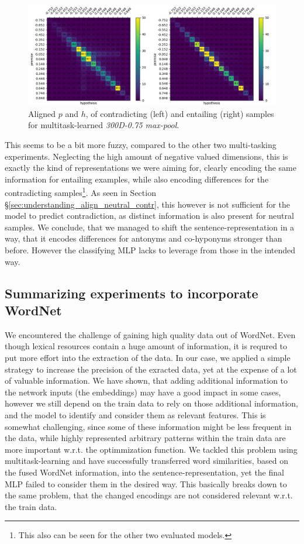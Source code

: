 \begin{figure}[tph!]
\centering
	\includegraphics[totalheight=7cm]{fig/masking_e_c.png}
	\caption{Aligned $p$ and $h$, of contradicting (left) and entailing (right) samples for multitask-learned \textit{300D-0.75 max-pool}.}
	\label{fig:masking_e_c}
\end{figure}
This seems to be a bit more fuzzy, compared to the other two multi-tasking experiments. Neglecting the high amount of negative valued dimensions, this is exactly the kind of representations we were aiming for, clearly encoding the same information for entailing examples, while also encoding differences for the contradicting samples\footnote{This also can be seen for the other two evaluated models.}. As seen in Section §\ref{sec:understanding_align_neutral_contr}, this however is not sufficient for the model to predict contradiction, as distinct information is also present for neutral samples. We conclude, that we managed to shift the sentence-representation in a way, that it encodes differences for antonyms and co-hyponyms stronger than before. However the classifying \ac{MLP} lacks to leverage from those in the intended way. 
\subsection{Summarizing experiments to incorporate WordNet}
We encountered the challenge of gaining high quality data out of WordNet. Even though lexical resources contain a huge amount of information, it is requred to put more effort into the extraction of the data. In our case, we applied a simple strategy to increase the precision of the exracted data, yet at the expense of a lot of valuable information. We have shown, that adding additional information to the network inputs (the embeddings) may have a good impact in some cases, however we still depend on the train data to rely on those additional information, and the model to identify and consider them as relevant features. This is somewhat challenging, since some of these information might be less frequent in the data, while highly represented arbitrary patterns within the train data are more important w.r.t. the optimmization function. We tackled this problem using multitask-learning and have successfully transferred word similarities, based on the fused WordNet information, into the sentence-representation, yet the final \ac{MLP} failed to consider them in the desired way. This basically breaks down to the same problem, that the changed encodings are not considered relevant w.r.t. the train data.
